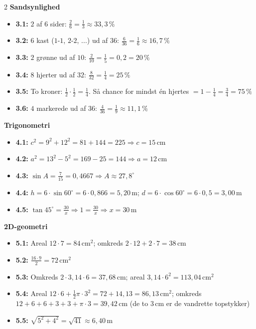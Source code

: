 \documentclass[11pt,a4paper]{article}
\begin{document}
\begin{multicols}{2}
\noindent\textbf{Sandsynlighed}
\begin{itemize}[leftmargin=1.3em, itemsep=1pt, topsep=2pt]
  \item \textbf{3.1:} $2$ af $6$ sider: $\tfrac{2}{6} = \tfrac{1}{3} \approx 33{,}3\,\%$
  \item \textbf{3.2:} $6$ kast ($1$-$1$, $2$-$2$, ...) ud af $36$:
        $\tfrac{6}{36} = \tfrac{1}{6} \approx 16{,}7\,\%$
  \item \textbf{3.3:} $2$ grønne ud af $10$: $\tfrac{2}{10} = \tfrac{1}{5} = 0{,}2 = 20\,\%$
  \item \textbf{3.4:} $8$ hjerter ud af $32$: $\tfrac{8}{32} = \tfrac{1}{4} = 25\,\%$
  \item \textbf{3.5:} To kroner: $\tfrac{1}{2}\cdot\tfrac{1}{2} = \tfrac{1}{4}$.
        Så chance for mindst én hjertes $= 1 - \tfrac{1}{4} = \tfrac{3}{4} = 75\,\%$
  \item \textbf{3.6:} $4$ markerede ud af $36$: $\tfrac{4}{36} = \tfrac{1}{9} \approx 11{,}1\,\%$
\end{itemize}

\columnbreak

\noindent\textbf{Trigonometri}
\begin{itemize}[leftmargin=1.3em, itemsep=1pt, topsep=2pt]
  \item \textbf{4.1:} $c^{2} = 9^{2} + 12^{2} = 81 + 144 = 225 \Rightarrow c = 15\,\text{cm}$
  \item \textbf{4.2:} $a^{2} = 13^{2} - 5^{2} = 169 - 25 = 144 \Rightarrow a = 12\,\text{cm}$
  \item \textbf{4.3:} $\sin A = \tfrac{7}{15} = 0{,}4667 \Rightarrow A \approx 27{,}8^{\circ}$
  \item \textbf{4.4:} $h = 6 \cdot \sin 60^{\circ} = 6 \cdot 0{,}866 = 5{,}20\,\text{m}$;
        $d = 6 \cdot \cos 60^{\circ} = 6 \cdot 0{,}5 = 3{,}00\,\text{m}$
  \item \textbf{4.5:} $\tan 45^{\circ} = \tfrac{30}{x} \Rightarrow 1 = \tfrac{30}{x}
        \Rightarrow x = 30\,\text{m}$
\end{itemize}

\noindent\textbf{2D-geometri}
\begin{itemize}[leftmargin=1.3em, itemsep=1pt, topsep=2pt]
  \item \textbf{5.1:} Areal $12 \cdot 7 = 84\,\text{cm}^{2}$;
        omkreds $2 \cdot 12 + 2 \cdot 7 = 38\,\text{cm}$
  \item \textbf{5.2:} $\tfrac{16 \cdot 9}{2} = 72\,\text{cm}^{2}$
  \item \textbf{5.3:} Omkreds $2 \cdot 3{,}14 \cdot 6 = 37{,}68\,\text{cm}$;
        areal $3{,}14 \cdot 6^{2} = 113{,}04\,\text{cm}^{2}$
  \item \textbf{5.4:} Areal $12 \cdot 6 + \tfrac{1}{2}\pi \cdot 3^{2}
        = 72 + 14{,}13 = 86{,}13\,\text{cm}^{2}$;
        omkreds $12 + 6 + 6 + 3 + 3 + \pi \cdot 3 = 39{,}42\,\text{cm}$
        (de to $3\,\text{cm}$ er de vandrette topstykker)
  \item \textbf{5.5:} $\sqrt{5^{2} + 4^{2}} = \sqrt{41} \approx 6{,}40\,\text{m}$
\end{itemize}


\end{multicols}
\end{document}
